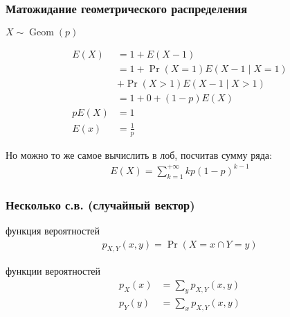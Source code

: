 \documentclass[hyperref=unicode,graphics=pdflatex,13pt,xcolor={usenames,dvipsnames}]{beamer}
\renewcommand\emph[1]{{\color{blue}{#1}}}
\DeclareMathOperator{\Geom}{Geom}
\begin{document}
\begin{frame}
  \frametitle{Матожидание геометрического распределения}

  $X \sim \Geom(p)$

  \begin{align*}
    E(X)  &= 1 + E(X - 1) \\
          &= 1 + \Pr(X = 1) E(X - 1 \mid X = 1) \\
          &+ \Pr(X > 1) E(X - 1 \mid X > 1) \\
          &= 1 + 0 + (1 - p) E(X) \\
    pE(X) &= 1 \\
    E(x)  &= \frac{1}{p}
  \end{align*}

  \pause
  Но можно то же самое вычислить в лоб, посчитав сумму ряда:
  \begin{align*}
    E(X) = \sum_{k = 1}^{+\infty} k p(1 - p)^{k - 1}
  \end{align*}

\end{frame}

\begin{frame}
  \frametitle{Несколько с.в. (случайный вектор)}

  \emph{Совместная} функция вероятностей 
  \begin{align*}
    p_{X, Y}(x, y) = \Pr(X = x \cap Y = y)
  \end{align*}

  \emph{Маргинальные} функции вероятностей
  \begin{align*}
    p_X(x) &= \sum_y p_{X, Y}(x, y) \\
    p_Y(y) &= \sum_x p_{X, Y}(x, y)
  \end{align*}
\end{frame}
\end{document}
